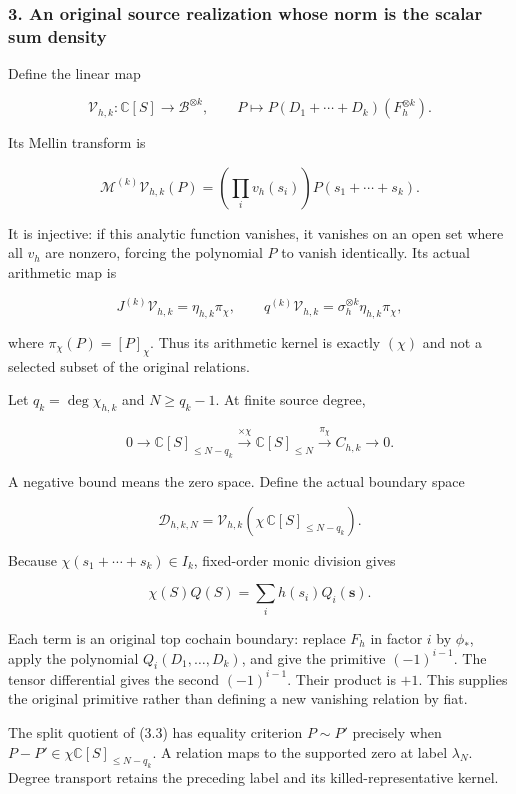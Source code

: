 \subsubsection{3. An original source realization whose norm is the scalar
sum
density}\label{cyclic_sum:an-original-source-realization-whose-norm-is-the-scalar-sum-density}

Define the linear map

\[\boxed{\mathcal V_{h,k}:\mathbb C[S]\to\mathscr B^{\otimes k},\qquad
P\mapsto P(D_1+\cdots+D_k)(F_h^{\otimes k}).}\tag{3.1}\]

Its Mellin transform is

\[\mathcal M^{(k)}\mathcal V_{h,k}(P)
=\left(\prod_i v_h(s_i)\right)P(s_1+\cdots+s_k).\]

It is injective: if this analytic function vanishes, it vanishes on an
open set where all \(v_h\) are nonzero, forcing the polynomial \(P\) to
vanish identically. Its actual arithmetic map is

\[\boxed{J^{(k)}\mathcal V_{h,k}=\eta_{h,k}\pi_\chi,\qquad
q^{(k)}\mathcal V_{h,k}=\sigma_h^{\otimes k}\eta_{h,k}\pi_\chi,}\tag{3.2}\]

where \(\pi_\chi(P)=[P]_\chi\). Thus its arithmetic kernel is exactly
\((\chi)\) and not a selected subset of the original relations.

Let \(q_k=\deg\chi_{h,k}\) and \(N\ge q_k-1\). At finite source degree,

\[\boxed{0\to\mathbb C[S]_{\le N-q_k}\xrightarrow{\times\chi}
\mathbb C[S]_{\le N}\xrightarrow{\pi_\chi}C_{h,k}\to0.}\tag{3.3}\]

A negative bound means the zero space. Define the actual boundary space

\[\mathcal D_{h,k,N}=\mathcal V_{h,k}(\chi\,\mathbb C[S]_{\le N-q_k}).\]

Because \(\chi(s_1+\cdots+s_k)\in I_k\), fixed-order monic division
gives

\[\chi(S)Q(S)=\sum_i h(s_i)Q_i(\mathbf s).\tag{3.4}\]

Each term is an original top cochain boundary: replace \(F_h\) in factor
\(i\) by \(\phi_*\), apply the polynomial \(Q_i(D_1,\ldots,D_k)\), and
give the primitive \((-1)^{i-1}\). The tensor differential gives the
second \((-1)^{i-1}\). Their product is \(+1\). This supplies the
original primitive rather than defining a new vanishing relation by
fiat.

The split quotient of (3.3) has equality criterion \(P\sim P'\)
precisely when \(P-P'\in\chi\mathbb C[S]_{\le N-q_k}\). A relation maps
to the supported zero at label \(\lambda_N\). Degree transport retains
the preceding label and its killed-representative kernel.

